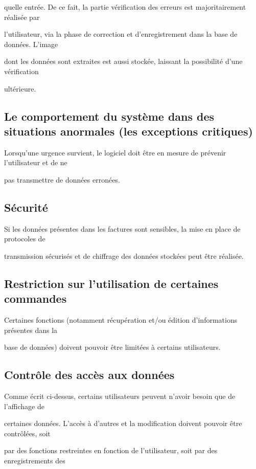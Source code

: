 \documentclass[a4paper,10pt]{article}
\begin{document}
quelle entrée. De ce fait, la partie vérification des erreurs est majoritairement réalisée par 

l’utilisateur, via la phase de correction et d’enregistrement dans la base de données. L’image 

dont les données sont extraites est aussi stockée, laissant la possibilité d’une vérification 

ultérieure.

\subsection{Le comportement du système dans des situations anormales (les exceptions critiques)}

Lorsqu’une urgence survient, le logiciel doit être en mesure de prévenir l’utilisateur et de ne 

pas transmettre de données erronées. 

\subsection{Sécurité}

Si les données présentes dans les factures sont sensibles, la mise en place de protocoles de 

transmission sécurisés et de chiffrage des données stockées peut être réalisée.

\subsection{Restriction sur l'utilisation de certaines commandes}

Certaines fonctions (notamment récupération et/ou édition d’informations présentes dans la 

base de données) doivent pouvoir être limitées à certains utilisateurs.

\subsection{Contrôle des accès aux données}

Comme écrit ci-dessus, certains utilisateurs peuvent n’avoir besoin que de l’affichage de 

certaines données. L’accès à d’autres et la modification doivent pouvoir être contrôlées, soit 

par des fonctions restreintes en fonction de l’utilisateur, soit par des enregistrements des 
\end{document}
